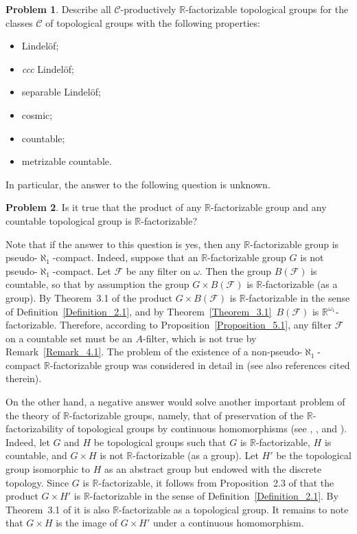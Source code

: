 \documentclass[a4paper,12pt]{amsart}
\theoremstyle{definition}
\newtheorem{problem}{Problem}[section]
\theoremstyle{remark}
\begin{document}
\begin{problem}
Describe all $\mathscr C$-productively $\mathbb R$-factorizable topological groups for the classes 
$\mathscr C$ of topological groups with the 
following properties: 
\begin{itemize}
\item[(i)]
Lindel\"of;
\item[(ii)]
 \emph{ccc} Lindel\"of; 
\item[(iii)]
separable Lindel\"of;
\item[(iv)]
cosmic; 
\item[(v)]
countable; 
\item[(vi)]
metrizable countable. 
\end{itemize}
\end{problem}

In particular, the answer to the following question is unknown. 

\begin{problem}
Is it true that the product of any $\mathbb R$-factorizable group and any countable topological group is $\mathbb 
R$-factorizable? 
\end{problem}

Note that if the answer to this question is yes, then any $\mathbb R$-factorizable group is 
pseudo-$\aleph_1$-compact. Indeed, suppose that an $\mathbb R$-factorizable group $G$ is not 
pseudo-$\aleph_1$-compact. Let $\mathscr F$ be any filter on $\omega$. Then the group $B(\mathscr F)$ is 
countable, so that by assumption the group $G\times B(\mathscr F)$ is $\mathbb R$-factorizable (as a group). By 
Theorem~3.1 of \cite{R-S_2025} the product $G\times B(\mathscr F)$ is $\mathbb R$-factorizable in the sense of 
Definition~\ref{Definition_2.1}, and by Theorem~\ref{Theorem_3.1} \,$B(\mathscr F)$ is $\mathbb R^{\omega_1}$-factorizable. 
Therefore, according to Proposition~\ref{Proposition_5.1}, any filter $\mathscr F$ on a countable set must be an 
$A$-filter, which is not true by Remark~\ref{Remark_4.1}.  The problem of the existence of a 
non-pseudo-$\aleph_1$-compact $\mathbb R$-factorizable group was considered in detail in \cite{R-S_2025} (see also 
references cited therein).

On the other hand, a negative answer would solve another important problem of the theory of 
$\mathbb R$-factorizable groups, namely, that of preservation of the $\mathbb R$-factorizability of topological 
groups by continuous homomorphisms (see \cite[Problem~3.9]{T_1991a}, \cite[Problem~8.4.1]{A-T}, and 
\cite[Question~2]{R-S_2025}). Indeed, let $G$ and $H$ be topological groups such that $G$ is $\mathbb R$-factorizable, 
$H$ is countable, and $G\times H$ is not $\mathbb R$-factorizable (as a group). Let $H'$ be the topological group 
isomorphic to $H$ as an abstract group but endowed with the discrete topology. Since $G$ is $\mathbb 
R$-factorizable, it follows from Proposition~2.3 of \cite{R-S_2025} that the product $G\times H'$ is $\mathbb 
R$-factorizable in the sense of Definition~\ref{Definition_2.1}. By Theorem~3.1 of \cite{R-S_2025} it is also $\mathbb 
R$-factorizable as a topological group. It remains to note that $G\times H$ is the image of $G\times H'$ under a 
continuous homomorphism.
\end{document}
